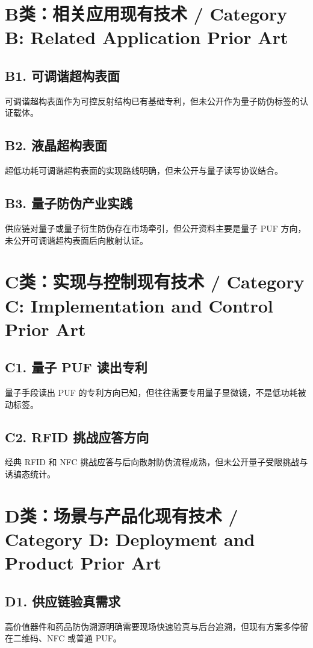 ﻿\documentclass[12pt,a4paper]{article}
\begin{document}
\section{B类：相关应用现有技术 / Category B: Related Application Prior Art}
\subsection{B1. 可调谐超构表面}
可调谐超构表面作为可控反射结构已有基础专利，但未公开作为量子防伪标签的认证载体。

\subsection{B2. 液晶超构表面}
超低功耗可调谐超构表面的实现路线明确，但未公开与量子读写协议结合。

\subsection{B3. 量子防伪产业实践}
供应链对量子或量子衍生防伪存在市场牵引，但公开资料主要是量子 PUF 方向，未公开可调谐超构表面后向散射认证。

\section{C类：实现与控制现有技术 / Category C: Implementation and Control Prior Art}
\subsection{C1. 量子 PUF 读出专利}
量子手段读出 PUF 的专利方向已知，但往往需要专用量子显微镜，不是低功耗被动标签。

\subsection{C2. RFID 挑战应答方向}
经典 RFID 和 NFC 挑战应答与后向散射防伪流程成熟，但未公开量子受限挑战与诱骗态统计。

\section{D类：场景与产品化现有技术 / Category D: Deployment and Product Prior Art}
\subsection{D1. 供应链验真需求}
高价值器件和药品防伪溯源明确需要现场快速验真与后台追溯，但现有方案多停留在二维码、NFC 或普通 PUF。
\end{document}
